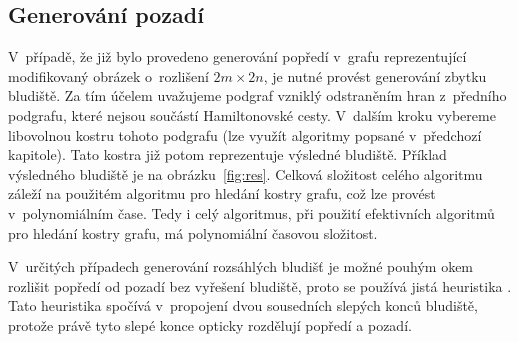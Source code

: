 \documentclass[a4paper,12pt]{article}
\begin{document}
\subsection{Generování pozadí}
V~případě, že již bylo provedeno generování popředí v~grafu reprezentující modifikovaný obrázek o~rozlišení $2m\times 2n$,
je nutné provést generování zbytku bludiště. Za tím účelem uvažujeme podgraf vzniklý odstraněním hran z~předního
podgrafu, které nejsou součástí Hamiltonovské cesty. V~dalším kroku vybereme libovolnou kostru tohoto podgrafu (lze
využít algoritmy popsané v~předchozí kapitole). Tato kostra již potom reprezentuje výsledné bludiště. Příklad výsledného 
bludiště je na obrázku~\ref{fig:res}. Celková 
složitost celého algoritmu záleží na použitém algoritmu pro hledání kostry grafu, což lze provést v~polynomiálním čase.
Tedy i celý algoritmus, při použití efektivních algoritmů pro hledání kostry grafu, má polynomiální časovou složitost.

V~určitých případech generování rozsáhlých bludišť je možné pouhým okem rozlišit popředí od pozadí bez vyřešení bludiště, proto
se používá jistá heuristika \cite{pic}. Tato heuristika spočívá v~propojení dvou sousedních slepých konců bludiště, protože právě tyto
slepé konce opticky rozdělují popředí a pozadí.
\end{document}
